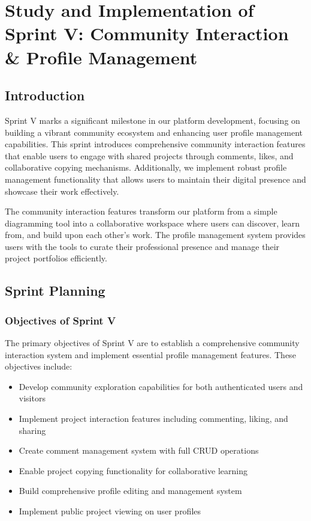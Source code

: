 \chapter[Sprint V]{Study and Implementation of Sprint V: Community Interaction \& Profile Management}


\section{Introduction}

Sprint V marks a significant milestone in our platform development, focusing on building a vibrant community ecosystem and enhancing user profile management capabilities. This sprint introduces comprehensive community interaction features that enable users to engage with shared projects through comments, likes, and collaborative copying mechanisms. Additionally, we implement robust profile management functionality that allows users to maintain their digital presence and showcase their work effectively.

The community interaction features transform our platform from a simple diagramming tool into a collaborative workspace where users can discover, learn from, and build upon each other's work. The profile management system provides users with the tools to curate their professional presence and manage their project portfolios efficiently.

\section{Sprint Planning}

\subsection{Objectives of Sprint V}

The primary objectives of Sprint V are to establish a comprehensive community interaction system and implement essential profile management features. These objectives include:

\begin{itemize}
\item Develop community exploration capabilities for both authenticated users and visitors
\item Implement project interaction features including commenting, liking, and sharing
\item Create comment management system with full CRUD operations
\item Enable project copying functionality for collaborative learning
\item Build comprehensive profile editing and management system
\item Implement public project viewing on user profiles
\end{itemize}

